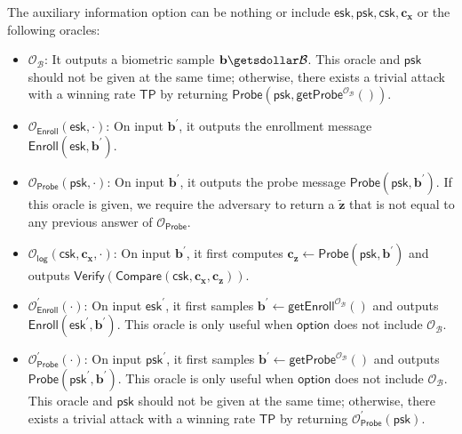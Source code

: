 The auxiliary information \textsf{option} can be nothing or include $\mathsf{esk}, \mathsf{psk}, \mathsf{csk}, \mathbf{c_x}$ or the following oracles:

\begin{itemize}

	\item $\mathcal{O}_{\mathcal{B}}$: It outputs a biometric sample $\mathbf{b} \getsdollar \mathcal{B}$. This oracle and $\mathsf{psk}$ should not be given at the same time; otherwise, there exists a trivial attack with a winning rate $\mathsf{TP}$ by returning $\mathsf{Probe}(\mathsf{psk}, \mathsf{getProbe}^{ \mathcal{O}_\mathcal{B} }() )$.
	
	\item $\mathcal{O}_{\mathsf{Enroll}}(\mathsf{esk}, \cdot)$: On input $\mathbf{b}^\prime$, it outputs the enrollment message $\mathsf{Enroll}(\mathsf{esk}, \mathbf{b}^\prime)$.

	\item $\mathcal{O}_{\mathsf{Probe}}(\mathsf{psk}, \cdot)$: On input $\mathbf{b}^\prime$, it outputs the probe message $\mathsf{Probe}(\mathsf{psk}, \mathbf{b}^\prime)$. If this oracle is given, we require the adversary to return a $\mathbf{\tilde{z}}$ that is not equal to any previous answer of $\mathcal{O}_\mathsf{Probe}$.
	
	\item $\mathcal{O}_\mathsf{log}(\mathsf{csk}, \mathbf{c_x}, \cdot)$: On input $\mathbf{b}^\prime$, it first computes $\mathbf{c_z} \gets \mathsf{Probe}(\mathsf{psk}, \mathbf{b}^\prime)$ and outputs $\mathsf{Verify}(\mathsf{Compare}(\mathsf{csk}, \mathbf{c_x}, \mathbf{c_z} ) )$.
	
	\item $\mathcal{O}_\textsf{Enroll}^\prime (\cdot)$: On input $\textsf{esk}^\prime$, it first samples $\mathbf{b}^\prime \gets \textsf{getEnroll}^{\mathcal{O}_{\mathcal{B}}}()$ and outputs $\textsf{Enroll}(\textsf{esk}^\prime, \mathbf{b}^\prime)$. This oracle is only useful when $\textsf{option}$ does not include $\mathcal{O}_{\mathcal{B}}$.

	\item $\mathcal{O}_\textsf{Probe}^\prime (\cdot)$: On input $\textsf{psk}^\prime$, it first samples $\mathbf{b}^\prime \gets \textsf{getProbe}^{\mathcal{O}_{\mathcal{B}}}()$ and outputs $\textsf{Probe}(\textsf{psk}^\prime, \mathbf{b}^\prime)$. This oracle is only useful when $\textsf{option}$ does not include $\mathcal{O}_{\mathcal{B}}$. This oracle and $\textsf{psk}$ should not be given at the same time; otherwise, there exists a trivial attack with a winning rate $\textsf{TP}$ by returning $\mathcal{O}_{\textsf{Probe}}^\prime (\textsf{psk})$.
	
\end{itemize}



